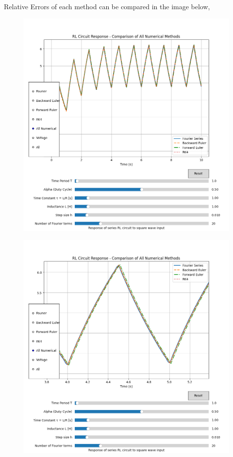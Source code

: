\documentclass[12pt,a4paper]{report}
\begin{document}
Relative Errors of each method can be compared in the image below,
\begin{figure}[h!]
\centering
\includegraphics[scale=0.5]{figs/numerical-1.png}
\end{figure}

\begin{figure}[h!]
\centering
\includegraphics[scale=0.5]{figs/numerical-2.png}
\end{figure}
\end{document}
